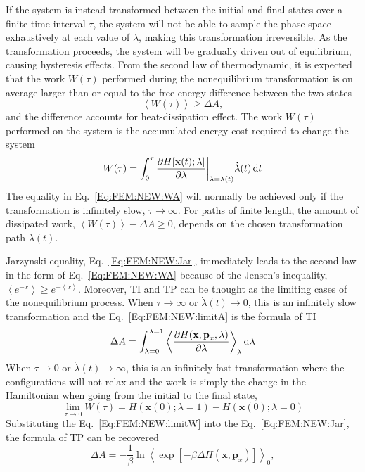 If the system is instead transformed between the initial and final states over a finite time interval $\tau$, the system will not be able to sample the phase space exhaustively at each value of $\lambda$, making this transformation irreversible. As the transformation proceeds, the system will be gradually driven out of equilibrium, causing hysteresis effects. From the second law of thermodynamic, it is expected that the work $W(\tau)$ performed during the nonequilibrium transformation is on average larger than or equal to the free energy difference between the two states
\begin{equation}
    \left \langle W(\tau) \right \rangle \ge \Delta A,
    \label{Eq:FEM:NEW:WA}
\end{equation} 
and the difference accounts for heat-dissipation effect. The work $W(\tau)$ performed on the system is the accumulated energy cost required to change the system
\begin{equation}
    W(\tau) = \int_{0}^{\tau} \frac{\partial{H[\textbf{x}(t);\lambda]}}{\partial{\lambda}}\bigg\rvert_{\lambda=\lambda(t)} \dot{\lambda}(t) \mathop{}\!\mathrm{d} t
    \label{Eq:FEM:NEW:work}
\end{equation}    
The equality in Eq.~\ref{Eq:FEM:NEW:WA} will normally be achieved only if the transformation is infinitely slow, $\tau\to\infty$.  For paths of finite length, the amount of dissipated work, $\left \langle W(\tau) \right \rangle - \Delta A \ge 0$, depends on the chosen transformation path $\lambda(t)$.

Jarzynski equality, Eq.~\ref{Eq:FEM:NEW:Jar}, immediately leads to the second law in the form of Eq.~\ref{Eq:FEM:NEW:WA} because of the Jensen's inequality, $\left \langle e^{-x} \right \rangle \ge e^{-\left<x\right>} $.
Moreover, TI and TP can be thought as the limiting cases of the nonequilibrium process. When $\tau\to\infty$ or $\dot{\lambda}(t)\to0$, this is an infinitely slow transformation and the Eq.~\ref{Eq:FEM:NEW:limitA} is the formula of TI
\begin{equation}
    \Delta A = \int_{\lambda=0}^{\lambda=1}\left \langle \frac{\partial{H(\textbf{x},\textbf{p}_{x},\lambda)}}{\partial{\lambda}} \right \rangle_{\lambda} \mathop{}\!\mathrm{d}\lambda
    \label{Eq:FEM:NEW:TINEW}
\end{equation}  
When $\tau\to0$ or $\dot{\lambda}(t)\to\infty$, this is an infinitely fast transformation where the configurations will not relax and the work is simply the change in the Hamiltonian when going from the initial to the final state,
\begin{equation}
    \lim_{\tau\to0}W(\tau) = H(\textbf{x}(0);\lambda=1)-H(\textbf{x}(0);\lambda=0)
    \label{Eq:FEM:NEW:limitW}
\end{equation}
Substituting the Eq.~\ref{Eq:FEM:NEW:limitW} into the Eq.~\ref{Eq:FEM:NEW:Jar}, the formula of TP can be recovered
\begin{equation}
    \Delta A = -\frac{1}{\beta} \ln \left \langle \exp[-\beta \Delta H(\textbf{x},\textbf{p}_{x})] \right \rangle _{0},
    \label{Eq:FEM:NEW:deltaA4NEW}
\end{equation}

